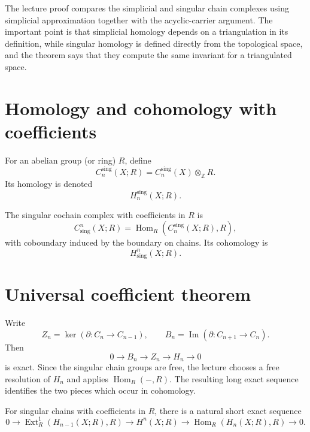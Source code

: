 \noindent
The lecture proof compares the simplicial and
singular chain complexes using simplicial
approximation together with the acyclic-carrier
argument. The important point is that simplicial
homology depends on a triangulation in its
definition, while singular homology is defined
directly from the topological space, and the
theorem says that they compute the same invariant
for a triangulated space.

\section{Homology and cohomology with coefficients}
\label{section-homology-cohomology-coefficients}

\begin{definition}
\label{definition-singular-homology-coefficients}
For an abelian group (or ring) $R$, define
\[
C_n^{\operatorname{sing}}(X;R)
=
C_n^{\operatorname{sing}}(X)\otimes_{\mathbb Z}R.
\]
Its homology is denoted
\[
H_n^{\operatorname{sing}}(X;R).
\]
\end{definition}

\begin{definition}
\label{definition-singular-cochains}
The singular cochain complex with coefficients in
$R$ is
\[
C^n_{\operatorname{sing}}(X;R)
=
\operatorname{Hom}_{R}
(C_n^{\operatorname{sing}}(X;R),R),
\]
with coboundary induced by the boundary on chains.
Its cohomology is
\[
H^n_{\operatorname{sing}}(X;R).
\]
\end{definition}

\section{Universal coefficient theorem}
\label{section-universal-coefficient-theorem}

\noindent
Write
\[
Z_n=\ker(\partial:C_n\to C_{n-1}),
\qquad
B_n=\operatorname{Im}(\partial:C_{n+1}\to C_n).
\]
Then
\[
0\longrightarrow B_n\longrightarrow Z_n
\longrightarrow H_n\longrightarrow0
\]
is exact. Since the singular chain groups are
free, the lecture chooses a free resolution of
$H_n$ and applies $\operatorname{Hom}_R(-,R)$.
The resulting long exact sequence identifies the
two pieces which occur in cohomology.

\begin{theorem}
\label{theorem-universal-coefficient-cohomology}
For singular chains with coefficients in $R$,
there is a natural short exact sequence
\[
0\longrightarrow
\operatorname{Ext}^1_R(H_{n-1}(X;R),R)
\longrightarrow
H^n(X;R)
\longrightarrow
\operatorname{Hom}_R(H_n(X;R),R)
\longrightarrow0.
\]
\end{theorem}

